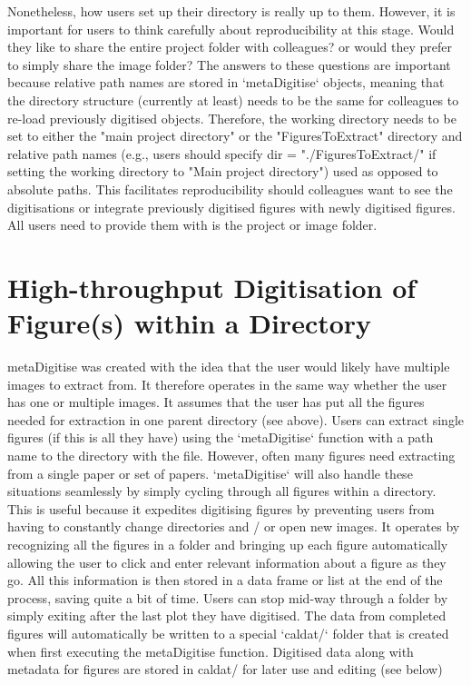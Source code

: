 \documentclass{article}
\begin{document}
Nonetheless, how users set up their directory is really up to them. However, it is important for users to think carefully about reproducibility at this stage. Would they like to share the entire project folder with colleagues? or would they prefer to simply share the image folder? The answers to these questions are important because relative path names are stored in `metaDigitise` objects, meaning that the directory structure (currently at least) needs to be the same for colleagues to re-load previously digitised objects. Therefore, the working directory needs to be set to either the "main project directory" or the "FiguresToExtract" directory and relative path names (e.g., users should specify dir = "./FiguresToExtract/" if setting the working directory to "Main project directory") used as opposed to absolute paths. This facilitates reproducibility should colleagues want to see the digitisations or integrate previously digitised figures with newly digitised figures. All users need to provide them with is the project or image folder.

\section*{High-throughput Digitisation of Figure(s) within a Directory}
metaDigitise was created with the idea that the user would likely have multiple images to extract from. It therefore operates in the same way whether the user has one or multiple images. It assumes that the user has put all the figures needed for extraction in one parent directory (see above). Users can extract single figures (if this is all they have) using the `metaDigitise` function with a path name to the directory with the file. However, often many figures need extracting from a single paper or set of papers. `metaDigitise` will also handle these situations seamlessly by simply cycling through all figures within a directory. This is useful because it expedites digitising figures by preventing users from having to constantly change directories and / or open new images. It operates by recognizing all the figures in a folder and bringing up each figure automatically allowing the user to click and enter relevant information about a figure as they go. All this information is then stored in a data frame or list at the end of the process, saving quite a bit of time. Users can stop mid-way through a folder by simply exiting after the last plot they have digitised. The data from completed figures will automatically be written to a special `caldat/` folder that is created when first executing the metaDigitise function. Digitised data along with metadata for figures are stored in caldat/ for later use and editing (see below)
\end{document}
